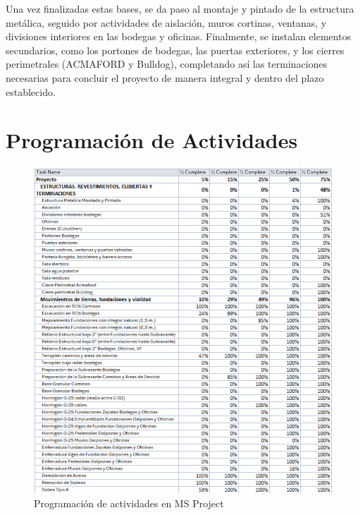 \documentclass{article} %
\begin{document}
Una vez finalizadas estas bases, se da paso al montaje y pintado de la estructura metálica, seguido por actividades de aislación, muros cortinas, ventanas, y divisiones interiores en las bodegas y oficinas. Finalmente, se instalan elementos secundarios, como los portones de bodegas, las puertas exteriores, y los cierres perimetrales (ACMAFORD y Bulldog), completando así las terminaciones necesarias para concluir el proyecto de manera integral y dentro del plazo establecido.

\newpage

\section{Programación de Actividades}

\begin{figure}[H]
    \centering
    \includegraphics[width=1\linewidth]{GRAFICOS/P1A.png}
    \caption{Programación de actividades en MS Project}
    \label{fig:programacion}
\end{figure}
\end{document}
